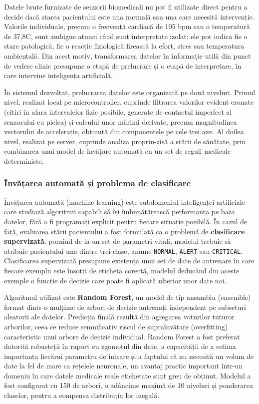 \documentclass[12pt,a4paper,twoside]{article}
\begin{document}
Datele brute furnizate de senzorii biomedicali nu pot fi utilizate direct pentru a decide dacă starea pacientului este una normală sau una care necesită intervenție. Valorile individuale, precum o frecvență cardiacă de 105 bpm sau o temperatură de 37,8\textdegree C, sunt ambigue atunci când sunt interpretate izolat: ele pot indica fie o stare patologică, fie o reacție fiziologică firească la efort, stres sau temperatura ambientală. Din acest motiv, transformarea datelor în informație utilă din punct de vedere clinic presupune o etapă de prelucrare și o etapă de interpretare, în care intervine inteligența artificială.

În sistemul dezvoltat, prelucrarea datelor este organizată pe două niveluri. Primul nivel, realizat local pe microcontroller, cuprinde filtrarea valorilor evident eronate (citiri în afara intervalelor fizic posibile, generate de contactul imperfect al senzorului cu pielea) și calculul unor mărimi derivate, precum magnitudinea vectorului de accelerație, obținută din componentele pe cele trei axe. Al doilea nivel, realizat pe server, cuprinde analiza propriu-zisă a stării de sănătate, prin combinarea unui model de învățare automată cu un set de reguli medicale deterministe.

\subsubsection{Învățarea automată și problema de clasificare}

Învățarea automată (machine learning) este subdomeniul inteligenței artificiale care studiază algoritmii capabili să își îmbunătățească performanța pe baza datelor, fără a fi programați explicit pentru fiecare situație posibilă. În cazul de față, evaluarea stării pacientului a fost formulată ca o problemă de \textbf{clasificare supervizată}: pornind de la un set de parametri vitali, modelul trebuie să atribuie pacientului una dintre trei clase, anume \texttt{NORMAL}, \texttt{ALERT} sau \texttt{CRITICAL}. Clasificarea supervizată presupune existența unui set de date de antrenare în care fiecare exemplu este însoțit de eticheta corectă, modelul deducând din aceste exemple o funcție de decizie care poate fi aplicată ulterior unor date noi.

Algoritmul utilizat este \textbf{Random Forest}, un model de tip ansamblu (ensemble) format dintr-o mulțime de arbori de decizie antrenați independent pe subseturi aleatorii ale datelor. Predicția finală rezultă din agregarea voturilor tuturor arborilor, ceea ce reduce semnificativ riscul de supraînvățare (overfitting) caracteristic unui arbore de decizie individual. Random Forest a fost preferat datorită robusteții în raport cu zgomotul din date, a capacității de a estima importanța fiecărui parametru de intrare și a faptului că nu necesită un volum de date la fel de mare ca rețelele neuronale, un avantaj practic important într-un domeniu în care datele medicale reale etichetate sunt greu de obținut. Modelul a fost configurat cu 150 de arbori, o adâncime maximă de 10 niveluri și ponderarea claselor, pentru a compensa distribuția lor inegală.
\end{document}
